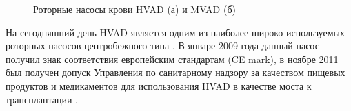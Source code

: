 \begin{figure}[ht]
  \begin{minipage}[ht]{0.48\linewidth}
  \end{minipage}
  \hfill
  \begin{minipage}[ht]{0.48\linewidth}
  \end{minipage}
  \caption{Роторные насосы крови HVAD (а) и MVAD (б) \cite{cheung2015design}}
  \label{img:heartware_pumps}  
\end{figure}

На сегодняшний день HVAD является одним из наиболее широко используемых роторных насосов центробежного типа \cite{chorpenning2014heartware, rich2017hvad}. В январе 2009 года данный насос получил знак соответствия европейским стандартам (CE mark), в ноябре 2011 был получен допуск Управления по санитарному надзору за качеством пищевых продуктов и медикаментов для использования HVAD в качестве моста к трансплантации \cite{Carrel01012013}. 

